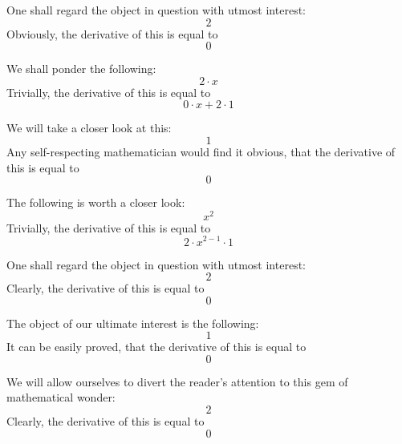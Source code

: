 \documentclass{article}
\begin{document}
One shall regard the object in question with utmost interest:
\begin{equation}
2 
\end{equation}
Obviously, the derivative of this is equal to
\begin{equation}
0 
\end{equation}

We shall ponder the following:
\begin{equation}
2 \cdot x 
\end{equation}
Trivially, the derivative of this is equal to
\begin{equation}
0 \cdot x + 2 \cdot 1 
\end{equation}

We will take a closer look at this:
\begin{equation}
1 
\end{equation}
Any self-respecting mathematician would find it obvious, that the derivative of this is equal to
\begin{equation}
0 
\end{equation}

The following is worth a closer look:
\begin{equation}
x ^{2 } 
\end{equation}
Trivially, the derivative of this is equal to
\begin{equation}
2 \cdot x ^{2 - 1 } \cdot 1 
\end{equation}

One shall regard the object in question with utmost interest:
\begin{equation}
2 
\end{equation}
Clearly, the derivative of this is equal to
\begin{equation}
0 
\end{equation}

The object of our ultimate interest is the following:
\begin{equation}
1 
\end{equation}
It can be easily proved, that the derivative of this is equal to
\begin{equation}
0 
\end{equation}

We will allow ourselves to divert the reader's attention to this gem of mathematical wonder:
\begin{equation}
2 
\end{equation}
Clearly, the derivative of this is equal to
\begin{equation}
0 
\end{equation}
\end{document}
